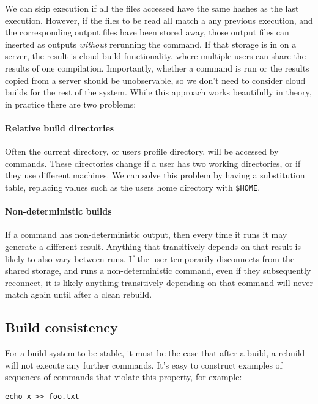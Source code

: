 We can skip execution if all the files accessed have the same hashes as the last execution. However, if the files to be read all match a any previous execution, and the corresponding output files have been stored away, those output files can inserted as outputs \emph{without} rerunning the command. If that storage is in on a server, the result is cloud build functionality, where multiple users can share the results of one compilation. Importantly, whether a command is run or the results copied from a server should be unobservable, so we don't need to consider cloud builds for the rest of the system. While this approach works beautifully in theory, in practice there are two problems:

\paragraph{Relative build directories} Often the current directory, or users profile directory, will be accessed by commands. These directories change if a user has two working directories, or if they use different machines. We can solve this problem by having a substitution table, replacing values such as the users home directory with \texttt{\$HOME}.

\paragraph{Non-deterministic builds} If a command has non-deterministic output, then every time it runs it may generate a different result. Anything that transitively depends on that result is likely to also vary between runs. If the user temporarily disconnects from the shared storage, and runs a non-deterministic command, even if they subsequently reconnect, it is likely anything transitively depending on that command will never match again until after a clean rebuild.

\subsection{Build consistency}
\label{sec:hazards}

For a \Make build system to be stable, it must be the case that after a build, a rebuild will not execute any further commands. It's easy to construct examples of sequences of commands that violate this property, for example:

\begin{verbatim}
echo x >> foo.txt
\end{verbatim}


